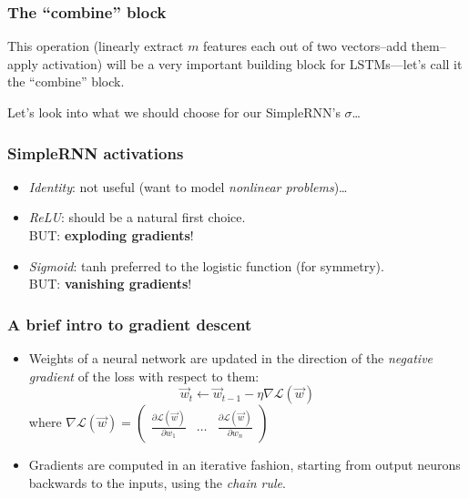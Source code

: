 \documentclass{beamer}
\begin{document}
\begin{frame}
	\frametitle{The ``combine'' block}
	This operation (linearly extract $m$ features each out of two vectors--add them--apply activation) will be a very important building block for LSTMs---let's call it the ``combine'' block.
	\vfill
	\begin{center}
	\end{center}
	Let's look into what we should choose for our SimpleRNN's $\sigma$\dots
\end{frame}

\begin{frame}
	\frametitle{SimpleRNN activations}
	\begin{itemize}
		\item \emph{Identity}: not useful (want to model \emph{nonlinear problems})\dots
		\vfill
		\item \emph{ReLU}: should be a natural first choice.\\BUT: \textbf{exploding gradients}!
		\vfill
		\item \emph{Sigmoid}: tanh preferred to the logistic function (for symmetry).\\BUT: \textbf{vanishing gradients}!
	\end{itemize}
\end{frame}

\begin{frame}
	\frametitle{A brief intro to gradient descent}
	\begin{itemize}
		\item Weights of a neural network are updated in the direction of the \emph{negative gradient} of the loss with respect to them:
		\[\vec{w}_t \leftarrow \vec{w}_{t-1} - \eta\nabla\mathcal{L}(\vec{w})\]
		where $\nabla\mathcal{L}(\vec{w}) = \begin{pmatrix}\frac{\partial\mathcal{L}(\vec{w})}{\partial w_1} & \dots & \frac{\partial\mathcal{L}(\vec{w})}{\partial w_n}\end{pmatrix}$
		\vfill
		\item Gradients are computed in an iterative fashion, starting from output neurons backwards to the inputs, using the \emph{chain rule}.
	\end{itemize}
\end{frame}
\end{document}

